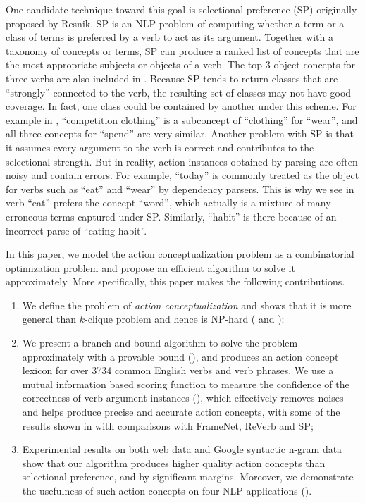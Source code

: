 One candidate technique toward this goal is selectional preference
(SP) originally proposed by Resnik\cite{resnik1996selectional}.
SP is an NLP problem of computing whether a term or
a class of terms is preferred by a verb
to act as its argument. Together with a taxonomy of concepts or terms,
SP can produce a ranked list of concepts that are the most appropriate
subjects or objects of a verb. The top 3 object concepts for
three verbs are also included in .
Because SP tends to return classes
that are ``strongly'' connected to the verb,
the resulting set of classes may not have good coverage.
In fact, one class could be contained by another under
this scheme. For example in ,
``competition clothing'' is a subconcept
of ``clothing'' for ``wear'', and all three concepts for ``spend''
are very similar. Another problem with SP is that it assumes
every argument to the verb is correct and contributes to
the selectional strength. But in reality, action instances obtained
by parsing are often noisy and contain errors.
For example, ``today'' is commonly treated as the object
for verbs such as ``eat'' and ``wear'' by dependency parsers.
This is why we see in 
verb ``eat'' prefers the concept ``word'', which actually
is a mixture of many erroneous terms captured under SP. Similarly,
``habit'' is there because of an incorrect parse of ``eating habit''.

In this paper, we model the action conceptualization problem as a combinatorial
optimization problem and propose an efficient algorithm to
solve it approximately. More specifically, this paper makes the
following contributions.
\begin{enumerate}
\item We define the problem of {\em action conceptualization}
and shows that it is more general than $k$-clique problem and hence is
NP-hard ( and );
\item We present a branch-and-bound algorithm to solve the problem
approximately with a provable bound (),
and produces an action concept lexicon for over 3734 common
English verbs and verb phrases. We use a mutual information
based scoring function to measure the confidence of the
correctness of verb argument instances (),
which effectively removes noises and helps produce precise and
accurate action concepts, with some of the results shown
in  with comparisons with FrameNet, ReVerb and SP;
\item Experimental results on both web data and Google syntactic n-gram
data show that our algorithm produces higher quality action concepts
than selectional preference, and by significant margins. Moreover,
we demonstrate the usefulness of such action concepts on four NLP applications ().
\end{enumerate}

